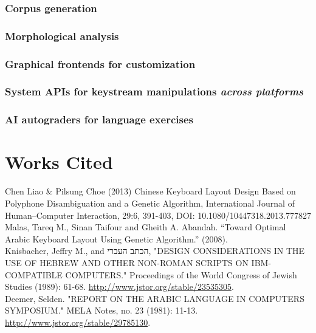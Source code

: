 \documentclass[11pt]{article}
\begin{document}
\subsubsection{Corpus generation}
\label{sec:orgf8c6f34}

\subsubsection{Morphological analysis}
\label{sec:org9a399c8}

\subsubsection{Graphical frontends for customization}
\label{sec:orgb3992fa}

\subsubsection{System APIs for keystream manipulations \emph{across platforms}}
\label{sec:org0a319b3}

\subsubsection{AI autograders for language exercises}
\label{sec:org05330a3}



\section{Works Cited}
\label{sec:org6dc718b}

Chen Liao \& Pilsung Choe (2013) Chinese Keyboard Layout Design Based on Polyphone Disambiguation and a Genetic Algorithm, International Journal of Human–Computer Interaction, 29:6, 391-403, DOI: 10.1080/10447318.2013.777827 \\

Malas, Tareq M., Sinan Taifour and Gheith A. Abandah. “Toward Optimal Arabic Keyboard Layout Using Genetic Algorithm.” (2008). \\

Knisbacher, Jeffry M., and \texthebrew{הכתב העברי}, "DESIGN CONSIDERATIONS IN THE USE OF HEBREW AND OTHER NON-ROMAN SCRIPTS ON IBM-COMPATIBLE COMPUTERS." Proceedings of the World Congress of Jewish Studies (1989): 61-68. \url{http://www.jstor.org/stable/23535305}. \\

Deemer, Selden. "REPORT ON THE ARABIC LANGUAGE IN COMPUTERS SYMPOSIUM." MELA Notes, no. 23 (1981): 11-13. \url{http://www.jstor.org/stable/29785130}. \\
\end{document}
